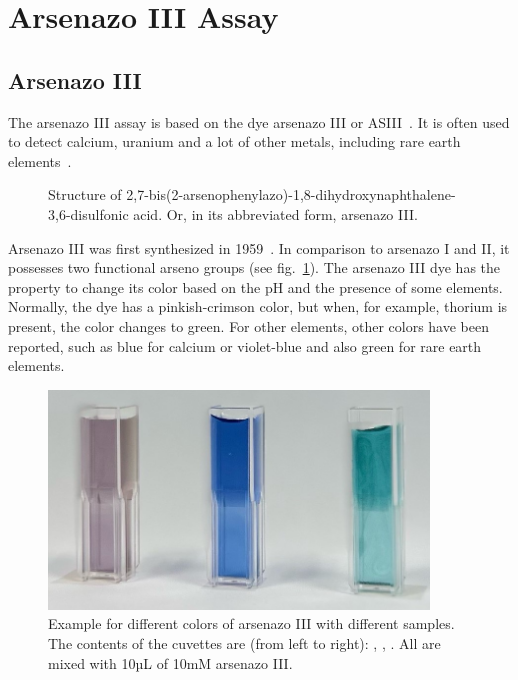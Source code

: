 \newpage


\section{Arsenazo III Assay}

\subsection{Arsenazo III}
The arsenazo III assay is based on the dye arsenazo III or ASIII~\cite{arsenazo3assay}.
It is often used to detect calcium, uranium and a lot of other metals, including rare earth elements~\cite{arsenazo3usage, arsenazo3othermetals}.

\begin{figure}[H]
    \centering
    \caption{Structure of 2,7-bis(2-arsenophenylazo)-1,8-dihydroxynaphthalene-3,6-disulfonic acid. Or, in its abbreviated form, arsenazo III.}
    \label{fig:asiii_structure}
\end{figure}

Arsenazo III was first synthesized in 1959~\cite{arsenazo3fortyyears}.
In comparison to arsenazo I and II, it possesses two functional arseno groups (see fig.~\ref{fig:asiii_structure}).
The arsenazo III dye has the property to change its color based on the pH and the presence of some elements.
Normally, the dye has a pinkish-crimson color, but when, for example, thorium is present, the color changes to green.
For other elements, other colors have been reported, such as blue for calcium or violet-blue and also green for rare earth elements.

\begin{figure}[H]
    \centering
    \includegraphics[width=0.9\textwidth]{./media/images/asiii_color_change}
    \caption{Example for different colors of arsenazo III with different samples. The contents of the cuvettes are (from left to right): , , . All are mixed with 10µL of 10mM arsenazo III.}
    \label{fig:asiii_colors}
\end{figure}

